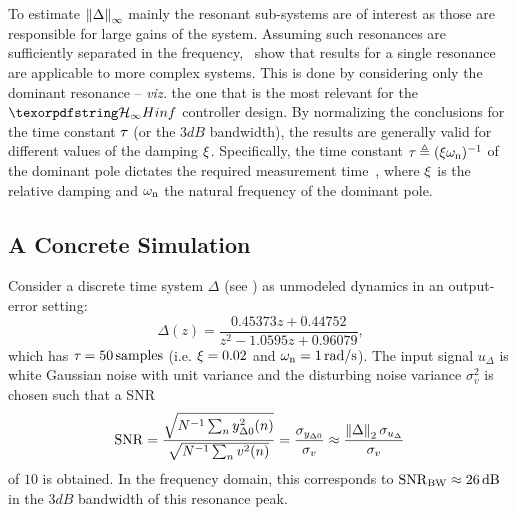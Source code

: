 To estimate $\left\| \Delta \right\|_{\infty}$ mainly the resonant sub-systems are of interest as those are responsible for large gains of the system.
Assuming such resonances are sufficiently separated in the frequency,~\citep{Schoukens2013LPMerror,Geerardyn2013TIM,Gawronski2004} show that results for a single resonance are applicable to more complex systems.
This is done by considering only the dominant resonance -- \emph{viz.} the one that is the most relevant for the $\Hinf{}$ controller design.
By normalizing the conclusions for the time constant $\tau_{}$ (or the $3\unit{dB}$ bandwidth), the results are generally valid for different values of the damping $\xi_{}$.
Specifically, the time constant $\tau_{} \triangleq (\xi_{} \omega_{\mathrm{n}})^{-1}$ of the dominant pole dictates the required measurement time~\citep{Schoukens2013LPMerror}, where $\xi_{}$ is the relative damping and $\omega_{\mathrm{n}}$ the natural frequency of the dominant pole.

\subsection{A Concrete Simulation}
Consider a discrete time system $\Delta$ (see ) as unmodeled dynamics in an output-error setting:
\begin{equation}
  \Delta(z) 
    =  \frac{0.45373 z + 0.44752}
            {z^2 - 1.0595 z + 0.96079}
  \label{eq:lrmhinf:O2sysDT}
  \text{,}
\end{equation}
which has $\tau_{} = 50 \,\mathrm{samples}$ (i.e. $\xi_{}=0.02$ and $\omega_{\mathrm{n}} = 1 \,\mathrm{rad/s}$).
The input signal $u_{\Delta}$ is white Gaussian noise with unit variance and the disturbing noise variance $\sigma_v^2$ is chosen such that a \gls{SNR} 
\begin{equation}
  \SNR = \frac{\sqrt{\inv{N}\sum_n y_{\Delta0}^2(n) }}%
              {\sqrt{\inv{N}\sum_n v^2(n) }}
       = \frac{\sigma_{y_{\Delta0}}}{\sigma_v}
       \approx \frac{\norm[2]{\Delta} \sigma_{u_{\Delta}}}{\sigma_v}
  \label{eq:lrmhinf:SNR}
\end{equation}
of $10$ is obtained.
In the frequency domain, this corresponds to $\mathrm{SNR}_{\mathrm{BW}} \approx 26 \,\mathrm{dB}$ in the $3\unit{dB}$ bandwidth of this resonance peak.

